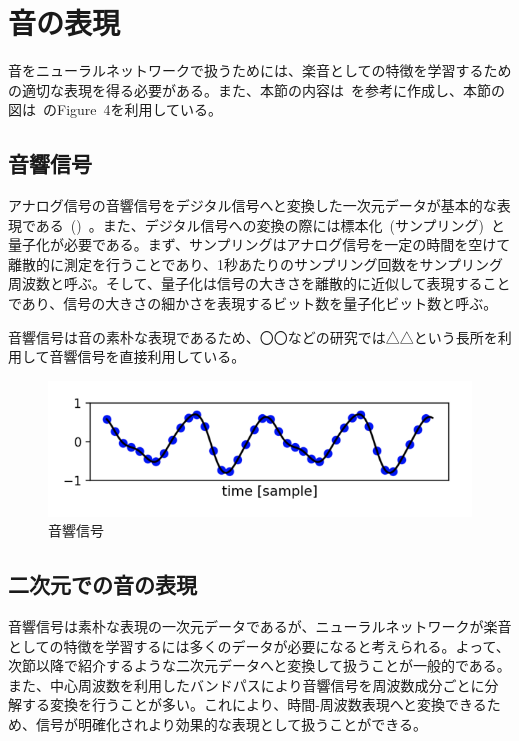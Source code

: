 \clearpage

\section{音の表現}
\label{sec:preprocess}

音をニューラルネットワークで扱うためには、楽音としての特徴を学習するための適切な表現を得る必要がある。また、本節の内容は~\cite{musictutorial}を参考に作成し、本節の図は~\cite{musictutorial}のFigure~4を利用している。

\subsection{音響信号}

アナログ信号の音響信号をデジタル信号へと変換した一次元データが基本的な表現である~()~。また、デジタル信号への変換の際には標本化~(サンプリング)~と量子化が必要である。まず、サンプリングはアナログ信号を一定の時間を空けて離散的に測定を行うことであり、1秒あたりのサンプリング回数をサンプリング周波数と呼ぶ。そして、量子化は信号の大きさを離散的に近似して表現することであり、信号の大きさの細かさを表現するビット数を量子化ビット数と呼ぶ。

音響信号は音の素朴な表現であるため、〇〇などの研究では△△という長所を利用して音響信号を直接利用している。

\begin{figure}[b]
\centering
\includegraphics[width=0.8\columnwidth]{figure/audio_signal.png}
\caption{音響信号}
\label{fig:audio_signal}
\end{figure}

\subsection{二次元での音の表現}

音響信号は素朴な表現の一次元データであるが、ニューラルネットワークが楽音としての特徴を学習するには多くのデータが必要になると考えられる。よって、次節以降で紹介するような二次元データへと変換して扱うことが一般的である。また、中心周波数を利用したバンドパスにより音響信号を周波数成分ごとに分解する変換を行うことが多い。これにより、時間-周波数表現へと変換できるため、信号が明確化されより効果的な表現として扱うことができる。

